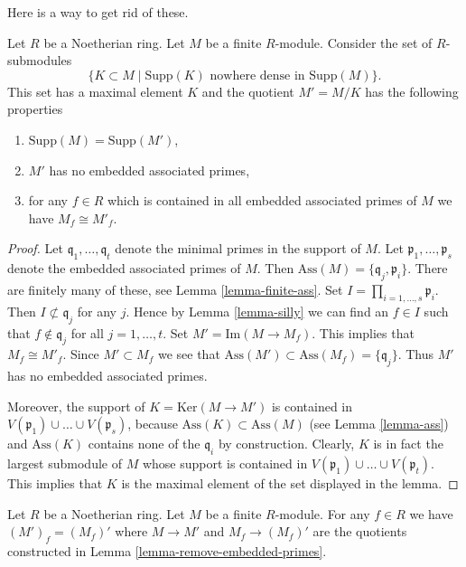 \noindent
Here is a way to get rid of these.

\begin{lemma}
\label{lemma-remove-embedded-primes}
Let $R$ be a Noetherian ring.
Let $M$ be a finite $R$-module.
Consider the set of $R$-submodules
$$
\{
K \subset M
\mid
\text{Supp}(K)
\text{ nowhere dense in }
\text{Supp}(M)
\}.
$$
This set has a maximal element $K$ and the quotient
$M' = M/K$ has the following properties
\begin{enumerate}
\item $\text{Supp}(M) = \text{Supp}(M')$,
\item $M'$ has no embedded associated primes,
\item for any $f \in R$ which is contained in all
embedded associated primes of $M$ we have $M_f \cong M'_f$.
\end{enumerate}
\end{lemma}

\begin{proof}
Let $\mathfrak q_1, \ldots, \mathfrak q_t$ denote the
minimal primes in the support of $M$. Let
$\mathfrak p_1, \ldots, \mathfrak p_s$ denote the
embedded associated primes of $M$. Then
$\text{Ass}(M) = \{\mathfrak q_j, \mathfrak p_i\}$.
There are finitely many of these,
see Lemma \ref{lemma-finite-ass}.
Set $I = \prod_{i = 1, \ldots, s} \mathfrak p_i$.
Then $I \not \subset \mathfrak q_j$ for
any $j$. Hence by Lemma \ref{lemma-silly} we can find an
$f \in I$ such that $f \not \in \mathfrak q_j$ for
all $j = 1, \ldots, t$. Set $M' = \text{Im}(M \to M_f)$.
This implies that $M_f \cong M'_f$. Since
$M' \subset M_f$ we see that
$\text{Ass}(M') \subset \text{Ass}(M_f) = \{\mathfrak q_j\}$.
Thus $M'$ has no embedded associated primes.

\medskip\noindent
Moreover, the support of $K = \text{Ker}(M \to M')$
is contained in $V(\mathfrak p_1) \cup \ldots \cup V(\mathfrak p_s)$,
because $\text{Ass}(K) \subset \text{Ass}(M)$
(see Lemma \ref{lemma-ass}) and $\text{Ass}(K)$ contains none
of the $\mathfrak q_i$ by construction.
Clearly, $K$ is in fact the largest submodule of $M$ whose support is
contained in $V(\mathfrak p_1) \cup \ldots \cup V(\mathfrak p_t)$.
This implies that $K$ is the maximal element of the set displayed
in the lemma.
\end{proof}

\begin{lemma}
\label{lemma-remove-embedded-primes-localize}
Let $R$ be a Noetherian ring.
Let $M$ be a finite $R$-module.
For any $f \in R$ we have $(M')_f = (M_f)'$ where
$M \to M'$ and $M_f \to (M_f)'$ are the quotients
constructed in Lemma \ref{lemma-remove-embedded-primes}.
\end{lemma}

